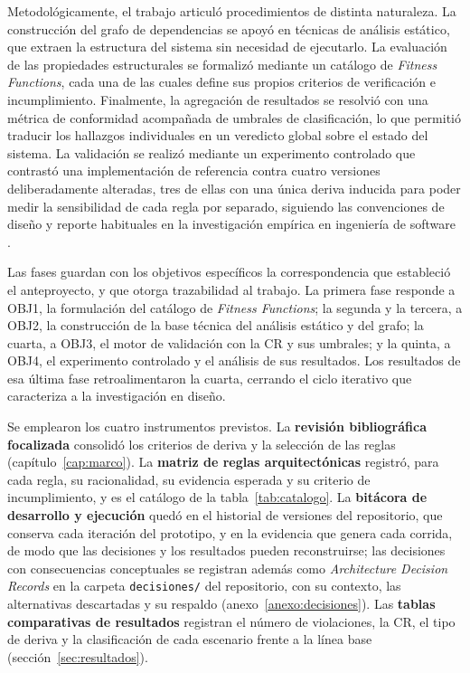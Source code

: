 Metodológicamente, el trabajo articuló procedimientos de distinta naturaleza. La construcción del grafo de dependencias se apoyó en técnicas de análisis estático, que extraen la estructura del sistema sin necesidad de ejecutarlo. La evaluación de las propiedades estructurales se formalizó mediante un catálogo de \textit{Fitness Functions}, cada una de las cuales define sus propios criterios de verificación e incumplimiento. Finalmente, la agregación de resultados se resolvió con una métrica de conformidad acompañada de umbrales de clasificación, lo que permitió traducir los hallazgos individuales en un veredicto global sobre el estado del sistema. La validación se realizó mediante un experimento controlado que contrastó una implementación de referencia contra cuatro versiones deliberadamente alteradas, tres de ellas con una única deriva inducida para poder medir la sensibilidad de cada regla por separado, siguiendo las convenciones de diseño y reporte habituales en la investigación empírica en ingeniería de software \citep{Wohlin2012, RunesonHost2009}.

Las fases guardan con los objetivos específicos la correspondencia que estableció el anteproyecto, y que otorga trazabilidad al trabajo. La primera fase responde a OBJ1, la formulación del catálogo de \textit{Fitness Functions}; la segunda y la tercera, a OBJ2, la construcción de la base técnica del análisis estático y del grafo; la cuarta, a OBJ3, el motor de validación con la CR y sus umbrales; y la quinta, a OBJ4, el experimento controlado y el análisis de sus resultados. Los resultados de esa última fase retroalimentaron la cuarta, cerrando el ciclo iterativo que caracteriza a la investigación en diseño.

Se emplearon los cuatro instrumentos previstos. La \textbf{revisión bibliográfica focalizada} consolidó los criterios de deriva y la selección de las reglas (capítulo~\ref{cap:marco}). La \textbf{matriz de reglas arquitectónicas} registró, para cada regla, su racionalidad, su evidencia esperada y su criterio de incumplimiento, y es el catálogo de la tabla~\ref{tab:catalogo}. La \textbf{bitácora de desarrollo y ejecución} quedó en el historial de versiones del repositorio, que conserva cada iteración del prototipo, y en la evidencia que genera cada corrida, de modo que las decisiones y los resultados pueden reconstruirse; las decisiones con consecuencias conceptuales se registran además como \textit{Architecture Decision Records} en la carpeta \texttt{decisiones/} del repositorio, con su contexto, las alternativas descartadas y su respaldo (anexo~\ref{anexo:decisiones}). Las \textbf{tablas comparativas de resultados} registran el número de violaciones, la CR, el tipo de deriva y la clasificación de cada escenario frente a la línea base (sección~\ref{sec:resultados}).

